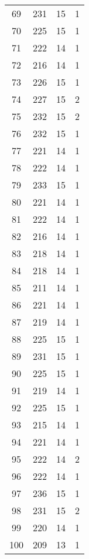 \begin{longtable}[!]{c|ccc}
	69	& 231	& 15	& 1	\\
	70	& 225	& 15	& 1	\\
	71	& 222	& 14	& 1	\\
	72	& 216	& 14	& 1	\\
	73	& 226	& 15	& 1	\\
	74	& 227	& 15	& 2	\\
	75	& 232	& 15	& 2	\\
	76	& 232	& 15	& 1	\\
	77	& 221	& 14	& 1	\\
	78	& 222	& 14	& 1	\\
	79	& 233	& 15	& 1	\\
	80	& 221	& 14	& 1	\\
	81	& 222	& 14	& 1	\\
	82	& 216	& 14	& 1	\\
	83	& 218	& 14	& 1	\\
	84	& 218	& 14	& 1	\\
	85	& 211	& 14	& 1	\\
	86	& 221	& 14	& 1	\\
	87	& 219	& 14	& 1	\\
	88	& 225	& 15	& 1	\\
	89	& 231	& 15	& 1	\\
	90	& 225	& 15	& 1	\\
	91	& 219	& 14	& 1	\\
	92	& 225	& 15	& 1	\\
	93	& 215	& 14	& 1	\\
	94	& 221	& 14	& 1	\\
	95	& 222	& 14	& 2	\\
	96	& 222	& 14	& 1	\\
	97	& 236	& 15	& 1	\\
	98	& 231	& 15	& 2	\\
	99	& 220	& 14	& 1	\\
	100	& 209	& 13	& 1	\\
\end{longtable}


